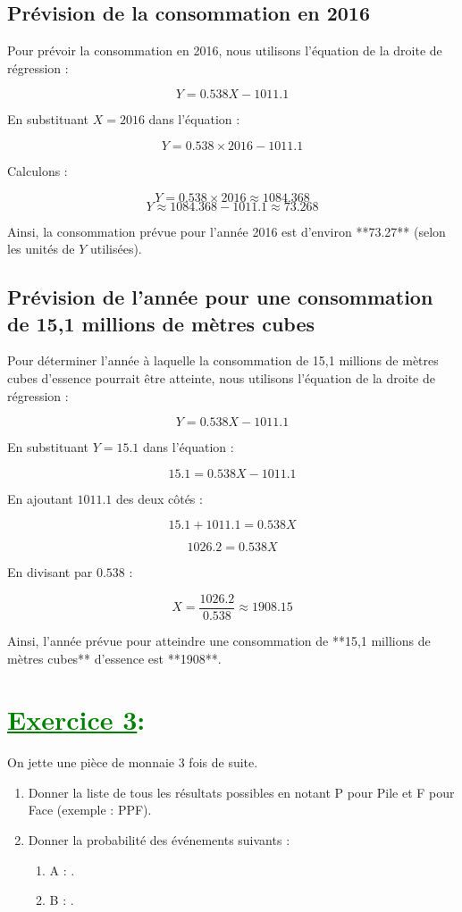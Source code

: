 \documentclass[12pt]{article}
\begin{document}
\subsection*{Prévision de la consommation en 2016}

Pour prévoir la consommation en 2016, nous utilisons l'équation de la droite de régression :

\[
Y = 0.538X - 1011.1
\]

En substituant \(X = 2016\) dans l'équation :

\[
Y = 0.538 \times 2016 - 1011.1
\]

Calculons :

\[
Y = 0.538 \times 2016 \approx 1084.368
\]
\[
Y \approx 1084.368 - 1011.1 \approx 73.268
\]

Ainsi, la consommation prévue pour l'année 2016 est d'environ **73.27** (selon les unités de \(Y\) utilisées).
\subsection*{Prévision de l'année pour une consommation de 15,1 millions de mètres cubes}

Pour déterminer l'année à laquelle la consommation de 15,1 millions de mètres cubes d'essence pourrait être atteinte, nous utilisons l'équation de la droite de régression :

\[
Y = 0.538X - 1011.1
\]

En substituant \(Y = 15.1\) dans l'équation :

\[
15.1 = 0.538X - 1011.1
\]

En ajoutant \(1011.1\) des deux côtés :

\[
15.1 + 1011.1 = 0.538X
\]

\[
1026.2 = 0.538X
\]

En divisant par \(0.538\) :

\[
X = \frac{1026.2}{0.538} \approx 1908.15
\]

Ainsi, l'année prévue pour atteindre une consommation de **15,1 millions de mètres cubes** d'essence est **1908**.
\section*{\textcolor{green}{\underline{Exercice 3}:}}
On jette une pièce de monnaie 3 fois de suite.

\begin{enumerate}
    \item Donner la liste de tous les résultats possibles en notant P pour Pile et F pour Face (exemple : PPF).
    \item Donner la probabilité des événements suivants :
    \begin{enumerate}
        \item A : .
        \item B : .
    \end{enumerate}
\end{enumerate}
\end{document}
